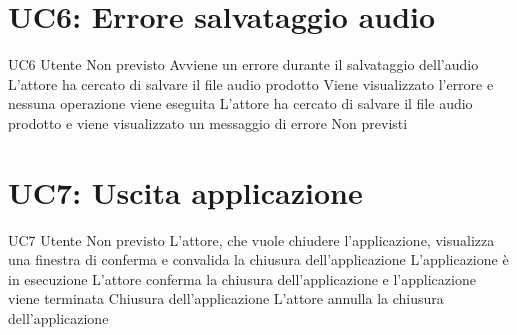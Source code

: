 \documentclass[../AnalisideiRequisiti.tex]{subfiles}
\begin{document}
\section{UC6: Errore salvataggio audio}
\UserCase
{UC6}
{Utente}
{Non previsto}
{Avviene un errore durante il salvataggio dell'audio}
{L'attore ha cercato di salvare il file audio prodotto} 
{Viene visualizzato l'errore e nessuna operazione viene eseguita}
{L'attore ha cercato di salvare il file audio prodotto e viene visualizzato un messaggio di errore}
{Non previsti}

\section{UC7: Uscita applicazione}
\UserCase
{UC7}
{Utente}
{Non previsto}
{L'attore, che vuole chiudere l'applicazione, visualizza una finestra di conferma e convalida la chiusura dell'applicazione}
{L'applicazione è in esecuzione}
{L'attore conferma la chiusura dell'applicazione e l'applicazione viene terminata}
{Chiusura dell'applicazione}
{L'attore annulla la chiusura dell'applicazione}
\end{document}
